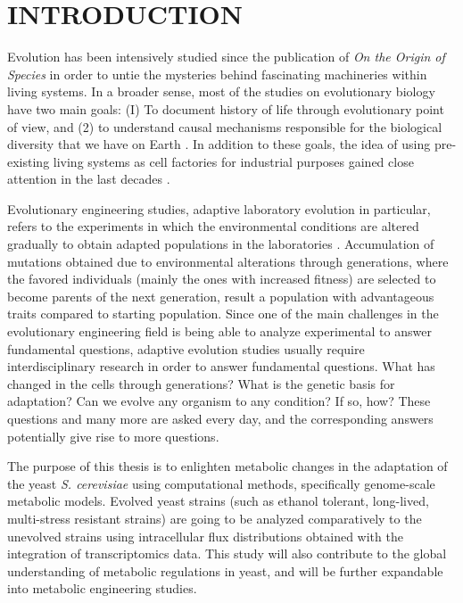 \chapter{INTRODUCTION}
Evolution has been intensively studied since the publication of \emph{On the Origin of Species} in order to untie the mysteries behind fascinating machineries within living systems. In a broader sense, most of the studies on evolutionary biology have two main goals: (I) To document history of life through evolutionary point of view, and (2) to understand causal mechanisms responsible for the biological diversity that we have on Earth \cite{futuyma2001evolution, hird2017evolutionary}. In addition to these goals, the idea of using pre-existing living systems as cell factories for industrial purposes gained close attention in the last decades \cite{nielsen2016engineering}.

Evolutionary engineering studies, adaptive laboratory evolution in particular, refers to the experiments in which the environmental conditions are altered gradually to obtain adapted populations in the laboratories \cite{garland2009experimental}. Accumulation of mutations obtained due to environmental alterations through generations, where the favored individuals (mainly the ones with increased fitness) are selected to become parents of the next generation, result a population with advantageous traits compared to starting population. Since one of the main challenges in the evolutionary engineering field is being able to analyze experimental to answer fundamental questions, adaptive evolution studies usually require interdisciplinary research in order to answer fundamental questions. What has changed in the cells through generations? What is the genetic basis for adaptation? Can we evolve any organism to any condition? If so, how? These questions and many more are asked every day, and the corresponding answers potentially give rise to more questions.

The purpose of this thesis is to enlighten metabolic changes in the adaptation of the yeast \emph{S. cerevisiae} using computational methods, specifically genome-scale metabolic models. Evolved yeast strains (such as ethanol tolerant, long-lived, multi-stress resistant strains) are going to be analyzed comparatively to the unevolved strains using intracellular flux distributions obtained with the integration of transcriptomics data. This study will also contribute to the global understanding of metabolic regulations in yeast, and will be further expandable into metabolic engineering studies.

